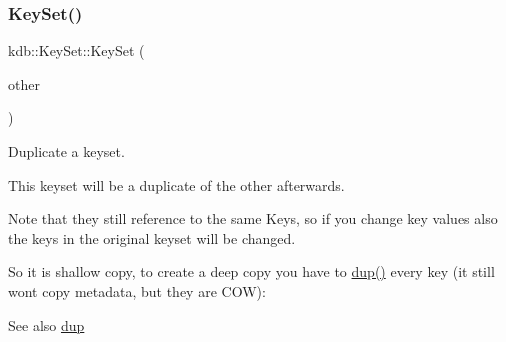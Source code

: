 \subsubsection{\texorpdfstring{KeySet()}{KeySet()}\hspace{0.1cm}{\footnotesize\ttfamily [3/5]}}
{\footnotesize\ttfamily kdb\+::\+Key\+Set\+::\+Key\+Set (\begin{DoxyParamCaption}\item[{const \mbox{\hyperlink{classkdb_1_1KeySet}{Key\+Set}} \&}]{other }\end{DoxyParamCaption})\hspace{0.3cm}{\ttfamily [inline]}}



Duplicate a keyset. 

This keyset will be a duplicate of the other afterwards.

\begin{DoxyNote}{Note}
that they still reference to the same Keys, so if you change key values also the keys in the original keyset will be changed.
\end{DoxyNote}
So it is shallow copy, to create a deep copy you have to \mbox{\hyperlink{classkdb_1_1KeySet_ad3f2b936d66729690e8a8a45b5074baa}{dup()}} every key (it still won\textquotesingle{}t copy metadata, but they are C\+OW)\+: 
\begin{DoxyCodeInclude}{0}
\DoxyCodeLine{\{}
\DoxyCodeLine{        \{}
\DoxyCodeLine{        \}}
\DoxyCodeLine{\}}
\end{DoxyCodeInclude}
 \begin{DoxySeeAlso}{See also}
\mbox{\hyperlink{classkdb_1_1KeySet_ad3f2b936d66729690e8a8a45b5074baa}{dup}} 
\end{DoxySeeAlso}
\mbox{\label{classkdb_1_1KeySet_a6191e93cdd67bbca63df934498d191ba}} 
